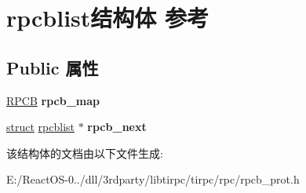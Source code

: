 \hypertarget{structrpcblist}{}\section{rpcblist结构体 参考}
\label{structrpcblist}
\subsection*{Public 属性}
\begin{DoxyCompactItemize}
\item 
\mbox{\label{structrpcblist_a930f6a19964f76fe933a972cbf771fed}} 
\hyperlink{structrpcb}{R\+P\+CB} {\bfseries rpcb\+\_\+map}
\item 
\mbox{\label{structrpcblist_af953d949edb7b565f56c3890556e2fe0}} 
\hyperlink{interfacestruct}{struct} \hyperlink{structrpcblist}{rpcblist} $\ast$ {\bfseries rpcb\+\_\+next}
\end{DoxyCompactItemize}


该结构体的文档由以下文件生成\+:\begin{DoxyCompactItemize}
\item 
E\+:/\+React\+O\+S-\/0../dll/3rdparty/libtirpc/tirpc/rpc/rpcb\+\_\+prot.\+h\end{DoxyCompactItemize}
